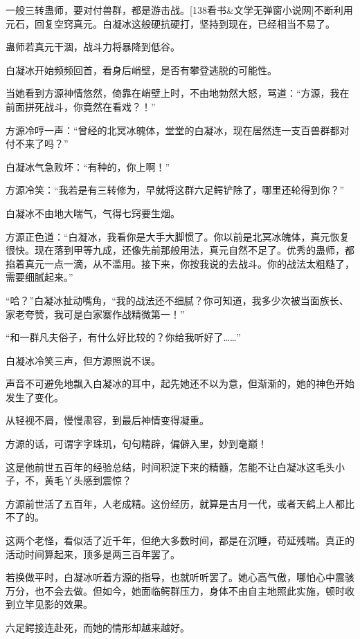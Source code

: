 
\begin{this_body}

一般三转蛊师，要对付兽群，都是游击战。[138看书\&文学无弹窗小说网]不断利用元石，回复空窍真元。白凝冰这般硬抗硬打，坚持到现在，已经相当不易了。

蛊师若真元干涸，战斗力将暴降到低谷。

白凝冰开始频频回首，看身后峭壁，是否有攀登逃脱的可能性。

当她看到方源神情悠然，倚靠在峭壁上时，不由地勃然大怒，骂道：“方源，我在前面拼死战斗，你竟然在看戏？！”

方源冷哼一声：“曾经的北冥冰魄体，堂堂的白凝冰，现在居然连一支百兽群都对付不来了吗？”

白凝冰气急败坏：“有种的，你上啊！”

方源冷笑：“我若是有三转修为，早就将这群六足鳄铲除了，哪里还轮得到你？”

白凝冰不由地大喘气，气得七窍要生烟。

方源正色道：“白凝冰，我看你是大手大脚惯了。你以前是北冥冰魄体，真元恢复很快。现在落到甲等九成，还像先前那般用法，真元自然不足了。优秀的蛊师，都掐着真元一点一滴，从不滥用。接下来，你按我说的去战斗。你的战法太粗糙了，需要细腻起来。”

“哈？”白凝冰扯动嘴角，“我的战法还不细腻？你可知道，我多少次被当面族长、家老夸赞，我可是白家寨作战精微第一！”

“和一群凡夫俗子，有什么好比较的？你给我听好了……”

白凝冰冷笑三声，但方源照说不误。

声音不可避免地飘入白凝冰的耳中，起先她还不以为意，但渐渐的，她的神色开始发生了变化。

从轻视不屑，慢慢肃容，到最后神情变得凝重。

方源的话，可谓字字珠玑，句句精辟，偏僻入里，妙到毫巅！

这是他前世五百年的经验总结，时间积淀下来的精髓，怎能不让白凝冰这毛头小子，不，黄毛丫头感到震惊？

方源前世活了五百年，人老成精。这份经历，就算是古月一代，或者天鹤上人都比不了的。

这两个老怪，看似活了近千年，但绝大多数时间，都是在沉睡，苟延残喘。真正的活动时间算起来，顶多是两三百年罢了。

若换做平时，白凝冰听着方源的指导，也就听听罢了。她心高气傲，哪怕心中震骇万分，也不会去做。但如今，她面临鳄群压力，身体不由自主地照此实施，顿时收到立竿见影的效果。

六足鳄接连赴死，而她的情形却越来越好。


\end{this_body}
